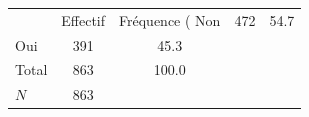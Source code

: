 {
\def\sym#1{\ifmmode^{#1}\else\(^{#1}\)\fi}
\begin{tabular}{l*{1}{cc}}
\toprule
            &    Effectif&Fréquence (%
\midrule
Non         &         472&        54.7\\
Oui         &         391&        45.3\\
Total       &         863&       100.0\\
\midrule
\(N\)       &         863&            \\
\bottomrule
\end{tabular}
}
